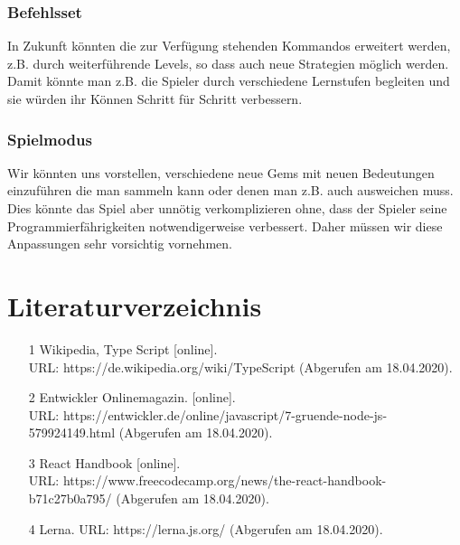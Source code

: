 \documentclass[11pt,a4paper,titlepage]{article}
\begin{document}
\subsubsection{Befehlsset}
In Zukunft könnten die zur Verfügung stehenden Kommandos erweitert werden, z.B. durch weiterführende Levels, so dass auch neue Strategien möglich werden. Damit könnte man z.B. die Spieler durch verschiedene Lernstufen begleiten und sie würden ihr Können Schritt für Schritt verbessern.

\subsubsection{Spielmodus}
Wir könnten uns vorstellen, verschiedene neue Gems mit neuen Bedeutungen einzuführen die man sammeln kann oder denen man z.B. auch ausweichen muss. Dies könnte das Spiel aber unnötig verkomplizieren ohne, dass der Spieler seine Programmierfährigkeiten notwendigerweise verbessert. Daher müssen wir diese Anpassungen sehr vorsichtig vornehmen.

\newpage

\section{Literaturverzeichnis}

\begin{itemize}
\item [1] Wikipedia, Type Script [online]. \\URL: https://de.wikipedia.org/wiki/TypeScript (Abgerufen am 18.04.2020).
\item [2] Entwickler Onlinemagazin.  [online]. \\URL: https://entwickler.de/online/javascript/7-gruende-node-js-579924149.html (Abgerufen am 18.04.2020).
\item [3] React Handbook [online]. \\URL: https://www.freecodecamp.org/news/the-react-handbook-b71c27b0a795/ (Abgerufen am 18.04.2020).
\item [4] Lerna. URL: https://lerna.js.org/ (Abgerufen am 18.04.2020).
\end{itemize}

\listoffigures
\end{document}
